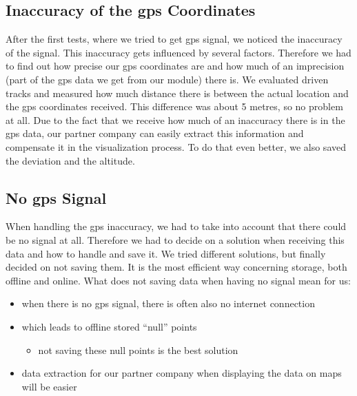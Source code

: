 \subsection{Inaccuracy of the \gls{gps} Coordinates}
After the first tests, where we tried to get \gls{gps} signal, we noticed the inaccuracy of the signal. This inaccuracy gets influenced by several factors. Therefore we had to find out how precise our \gls{gps} coordinates are and how much of an imprecision (part of the \gls{gps} data we get from our module) there is. 
\newline \newline
We evaluated driven tracks and measured how much distance there is between the actual location and the \gls{gps} coordinates received. This difference was about 5 metres, so no problem at all. 
\newline \newline
Due to the fact that we receive how much of an inaccuracy there is in the \gls{gps} data, our partner company can easily extract this information and compensate it in the visualization process. To do that even better, we also saved the deviation and the altitude.

\begin{center}
\end{center}

\subsection{No \gls{gps} Signal}
When handling the \gls{gps} inaccuracy, we had to take into account that there could be no signal at all. Therefore we had to decide on a solution when receiving this data and how to handle and save it.
\newline \newline
We tried different solutions, but finally decided on not saving them. It is the most efficient way concerning storage, both offline and online.
\newline \newline
What does not saving data when having no signal mean for us:
\begin{itemize}
\item when there is no \gls{gps} signal, there is often also no internet connection
\item which leads to offline stored “null” points
	\begin{itemize}
	\item not saving these null points is the best solution
	\end{itemize}		
\item data extraction for our partner company when displaying the data on maps will be easier
\end{itemize}